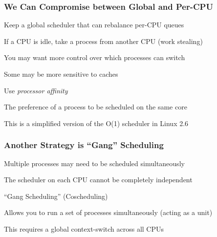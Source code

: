   \begin{frame}
    \frametitle{We Can Compromise between Global and Per-CPU}

    Keep a global scheduler that can rebalance per-CPU queues

    \hspace{2em} If a CPU is idle, take a process from another CPU (work stealing)

    \vspace{2em}

    You may want more control over which processes can switch

    \hspace{2em} Some may be more sensitive to caches

    \vspace{2em}

    Use \textit{processor affinity}

    \hspace{2em} The preference of a process to be scheduled on the same core

    \vspace{2em}

    This is a simplified version of the O(1) scheduler in Linux 2.6
  \end{frame}

  \begin{frame}
    \frametitle{Another Strategy is ``Gang'' Scheduling}

    Multiple processes may need to be scheduled simultaneously

    \vspace{2em}

    The scheduler on each CPU cannot be completely independent

    \vspace{2em}

    ``Gang Scheduling'' (Coscheduling)

    \hspace{2em} Allows you to run a set of processes simultaneously (acting as a unit)

    \vspace{2em}

    This requires a global context-switch across all CPUs
  \end{frame}

